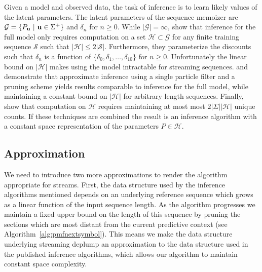 Given a model and observed data,  the task of inference is to learn likely values of the latent parameters.  The latent parameters of the sequence memoizer are  $\mathcal{G} = \{P_{\bf u} \ | \ {\bf u} \in \Sigma^{+} \}$ and $\delta_n$ for $n \geq 0$.  While $| \mathcal{G}| = \infty$, \citep{Wood2009} show that inference for the full model only requires computation on a set $\mathcal{H} \subset \mathcal{G}$ for any finite training sequence $\mathcal{S}$ such that $|\mathcal{H} | \leq 2 |\mathcal{S}|$.  Furthermore, they parameterize the discounts such that $\delta_n$ is a function of $\{\delta_0, \delta_1, \ldots, \delta_{10} \}$ for $n \geq 0$.   Unfortunately the linear bound on $|\mathcal{H}|$ makes using the model intractable for streaming sequences. \citep{Bartlett2010} and \citep{Gasthaus2010} demonstrate that approximate inference using a single particle filter and a pruning scheme yields results comparable to inference for the full model, while maintaining a constant bound on $|\mathcal{H}| $ for arbitrary length sequences.  Finally, \cite{Gasthaus2011} show that computation on $\mathcal{H}$ requires maintaining at most most $2|\Sigma| |\mathcal{H}|$ unique counts.  If these techniques are combined the result is an inference algorithm with a constant space representation of the parameters $P \in \mathcal{H}$.  

%
\subsection{Approximation}

We need to introduce two more approximations to render the algorithm appropriate for streams.  First, the data structure used by the inference algorithms mentioned depends on an underlying reference sequence which grows as a linear function of the input sequence length.  As the algorithm progresses we maintain a fixed upper bound on the length of this sequence by pruning the sections which are most distant from the current predictive context (see Algorithm~\ref{alg:pmfnextsymbol}).  This means we make the data structure underlying streaming deplump an approximation to the data structure used in the published inference algorithms, which allows our algorithm to maintain constant space complexity.

